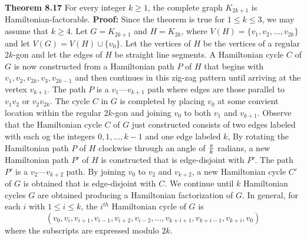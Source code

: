 \nopagenumbers
{\bf Theorem 8.17}
\vskip 6pt
For every integer $k \geq 1$, the complete graph $K_{2k+1}$ is Hamiltonian-factorable.
\vskip 10pt
{\bf Proof:}
\vskip 6pt
Since the theorem is true for $1 \leq k \leq 3$, we may assume that $k \geq 4$. Let $G=K_{2k+1}$ and $H=K_{2k}$, where $V(H)= \lbrace v_1,v_2, \ldots , v_{2k} \rbrace$ and let $V(G)=V(H) \cup \lbrace v_0 \rbrace$. Let the vertices of $H$ be the vertices of a regular $2k$-gon and let the edges of $H$ be straight line segments. A Hamiltonian cycle $C$ of $G$ is now constructed from a Hamiltonian path $P$ of $H$ that begins with $v_1,v_2,v_{2k},v_3,v_{2k-1}$ and then continues in this zig-zag pattern until arriving at the vertex $v_{k+1}$. The path $P$ is a $v_1$---$v_{k+1}$ path where edges are those parallel to $v_1v_2$ or $v_2v_{2k}$. The cycle $C$ in $G$ is completed by placing $v_0$ at some convient location within the regular $2k$-gon and joining $v_0$ to both $v_1$ and $v_{k+1}$.
\vskip 1mm
Observe that the Hamiltonian cycle $C$ of $G$ just constructed consists of two edges labeled with each og the integers $0,1, \ldots , k-1$ and one edge labeled $k$, By rotating the Hamiltonian path $P$ of $H$ clockwise through an angle of ${\pi \over k}$ radians, a new Hamiltonian path $P'$ of $H$ is constructed that is edge-disjoint with $P'$. The path $P'$ is a $v_2$---$v_{k+2}$ path. By joining $v_0$ to $v_2$ and $v_{k+2}$, a new Hamiltonian cycle $C'$ of $G$ is obtained that is edge-disjoint with $C$. We continue until $k$ Hamiltonian cycles $G$ are obtained producing a Hamiltonian factorization of $G$. In general, for each $i$ with $1 \leq i \leq k$, the $i^{th}$ Hamiltonian cycle of $G$ is $$(v_0,v_i,v_{i+1},v_{i-1},v_{i+2},v_{i-2}, \ldots ,v_{k+i+1},v_{k+i-1},v_{k+i},v_0)$$ where the subscripts are expressed modulo $2k$.

\vfill\eject
